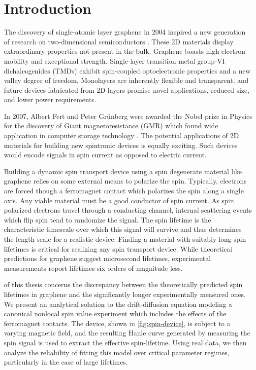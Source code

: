 \chapter{Introduction}

The discovery of single-atomic layer graphene in 2004
inspired a new generation of research on two-dimensional semiconductors
\cite{Novoselov666}.
These 2D materials display extraordinary properties not present in the bulk.
Graphene boasts high electron mobility and exceptional strength.
Single-layer transition metal group-VI dichalcogenides (TMDs)
exhibit spin-coupled optoelectronic properties
and a new valley degree of freedom.
Monolayers are inherently flexible and transparent,
and future devices fabricated from 2D layers promise
novel applications, reduced size, and lower power requirements.

In 2007, Albert Fert and Peter Grünberg were awarded
the Nobel prize in Physics for the discovery of
Giant magnetoresistance (GMR)
which found wide application in computer storage technology
\cite{PhysRevB.39.4828}.
The potential applications of 2D materials for
building new spintronic devices is equally exciting.
Such devices would encode signals in spin current
as opposed to electric current.

Building a dynamic spin transport device using a
spin degenerate material like graphene
relies on some external means to polarize the spin.
Typically, electrons are forced though a ferromagnet contact
which polarizes the spin along a single axis.
Any viable material must be a good conductor of spin current.
As spin polarized electrons travel through a conducting channel,
internal scattering events which flip spin tend to randomize the signal.
The spin lifetime is the characteristic timescale
over which this signal will survive
and thus determines the length scale for a realistic device.
Finding a material with suitably long spin lifetimes
is critical for realizing any spin transport device.
While theoretical predictions for graphene suggest microsecond lifetimes,
experimental measurements report lifetimes six orders of magnitude less.

 of this thesis
concerns the discrepancy
between the theoretically predicted spin lifetimes in graphene
and the significantly longer experimentally measured ones.
We present an analytical solution to the drift-diffusion equation
modeling a canonical nonlocal spin value experiment which
includes the effects of the ferromagnet contacts.
The device, shown in \cref{fig:spin-device},
is subject to a varying magnetic field,
and the resulting Hanle curve generated by measuring the spin signal
is used to extract the effective spin-lifetime.
Using real data, we then analyze the reliability of fitting this model
over critical parameter regimes, particularly in the case of large lifetimes.

